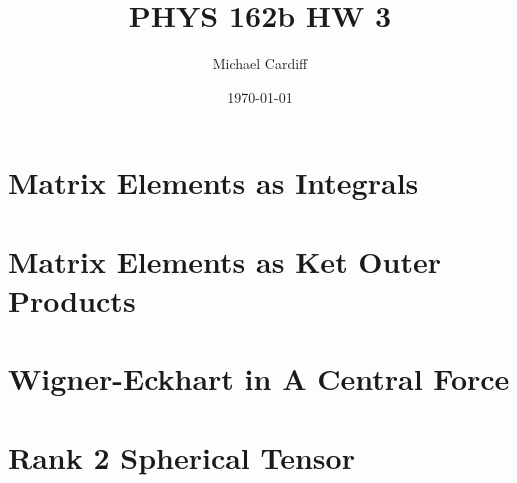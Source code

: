 \documentclass[12pt]{article}
\title{\vspace{-3em}PHYS 162b HW 3}
\author{Michael Cardiff}
\date{\today}
\begin{document}
\maketitle
\section{Matrix Elements as Integrals}

\section{Matrix Elements as Ket Outer Products}

\section{Wigner-Eckhart in A Central Force}

\section{Rank 2 Spherical Tensor}
\end{document}
